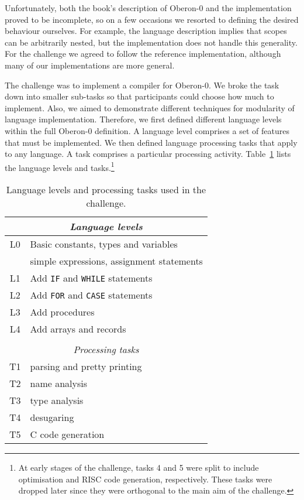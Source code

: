 Unfortunately, both the book's description of Oberon-0 and the implementation proved to be incomplete, so on a few occasions we resorted to defining the desired behaviour ourselves.
For example, the language description implies that scopes can be arbitrarily nested, but the implementation does not handle this generality.
For the challenge we agreed to follow the reference implementation, although many of our implementations are more general.

The challenge was to implement a compiler for Oberon-0.
We broke the task down into smaller sub-tasks so that participants could choose how much to implement.
Also, we aimed to demonstrate different techniques for modularity of language implementation.
Therefore, we first defined different language levels within the full Oberon-0 definition.
A language level comprises a set of features that must be implemented.
We then defined language processing tasks that apply to any language.
A task comprises a particular processing activity.
Table~\ref{tab:levelstasks} lists the language levels and tasks.\footnote{At early stages of the challenge, tasks 4 and 5 were split to include optimisation and RISC code generation, respectively. These tasks were dropped later since they were orthogonal to the main aim of the challenge.}

\begin{table}\centering
\begin{tabular}{|cl|} \hline
\multicolumn{2}{|c|}{\emph{Language levels}} \\ \hline
L0 & Basic constants, types and variables      \\
   & simple expressions, assignment statements \\ \hline
L1 & Add \verb|IF| and \verb|WHILE| statements \\ \hline
L2 & Add \verb|FOR| and \verb|CASE| statements \\ \hline
L3 & Add procedures                            \\ \hline
L4 & Add arrays and records                    \\ \hline
\multicolumn{2}{c}{} \\ \hline
\multicolumn{2}{|c|}{\emph{Processing tasks}} \\ \hline
T1 & parsing and pretty printing \\ \hline
T2 & name analysis \\ \hline
T3 & type analysis \\ \hline
T4 & desugaring \\ \hline
T5 & C code generation \\ \hline
\end{tabular}
\caption{Language levels and processing tasks used in the challenge.}
\label{tab:levelstasks}
\end{table}

